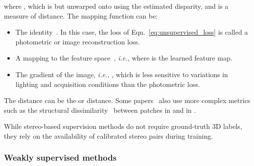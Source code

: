 \documentclass[10pt,journal,compsoc]{IEEEtran}
\newcommand{\ie}{\emph{i.e., }}
\newcommand{\noi}{\noindent}
\begin{document}
\noi where  , which is   but unwarped onto  using the estimated disparity, and  is a measure of distance. The mapping function   can be:
\begin{itemize}
	\item The identity~\cite{bai2016exploiting,zhou2017unsupervised,zhong2017self,yang2018segstereo}. In this case, the loss of Eqn.~\eqref{eq:unsupervised_loss} is called a photometric or image reconstruction loss. 
	
	\item A mapping to the  feature space~\cite{yang2018segstereo}, \ie  where  is the learned feature map. 
	
	\item The gradient of the image, \ie , which  is less sensitive to variations in lighting and acquisition conditions than the photometric loss.
	
\end{itemize}

\noi The distance   can be the  or  distance. Some papers~\cite{zhong2017self}  also use more complex metrics such as the structural  dissimilarity~\cite{wang2004image} between patches  in  and  in .










While stereo-based supervision methods do not require ground-truth 3D labels, they rely on the availability of  calibrated stereo pairs during training.


\subsubsection{Weakly supervised methods}
\label{sec:weakly_supervised}
\end{document}
